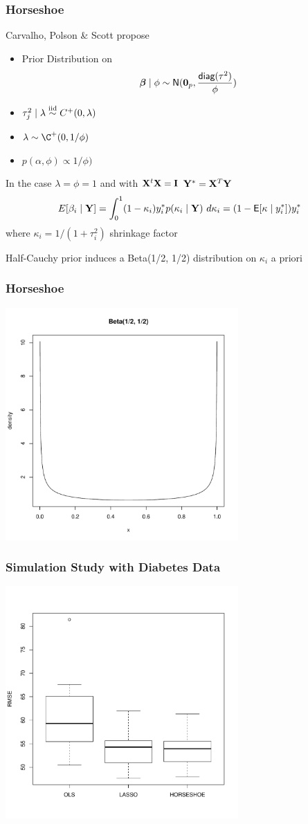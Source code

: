 \documentclass[handout]{beamer}
\begin{document}
\begin{frame}
  \frametitle{Horseshoe}
  Carvalho, Polson \& Scott  propose
\begin{itemize}
\item 
Prior Distribution on $$\boldsymbol{\beta} \mid \phi \sim \textsf{N}(\mathbf{0}_p, \frac{\textsf{diag}(\tau^2)}{ \phi
    }) $$ \pause
\item $\tau_j^2 \mid \lambda \mathrel{\mathop{\sim}\limits^{\rm iid}} C^+(0, \lambda)$ \pause
\item $\lambda \sim \C^+(0, 1/\phi)$ \pause
\item $p(\alpha, \phi) \propto 1/\phi)$ \pause
\end{itemize}

In the case $\lambda = \phi = 1$ and with $\mathbf{X}^t\mathbf{X} = \mathbf{I}$ $\mathbf{Y}^* =
\mathbf{X}^T\mathbf{Y}$ \pause
$$ 
E[\beta_i \mid \mathbf{Y}] = \int_0^1 (1 - \kappa_i) y^*_i p(\kappa_i \mid \mathbf{Y})
\ d\kappa_i = (1 - \textsf{E}[\kappa \mid y^*_i]) y^*_i$$
where $\kappa_i = 1/(1 + \tau_i^2)$ shrinkage factor \pause

\vspace{18pt}
Half-Cauchy prior induces a Beta(1/2, 1/2) distribution on $\kappa_i$
a priori
\end{frame}
\begin{frame}
\frametitle{Horseshoe}
  \includegraphics[height=3.5in]{beta}
\end{frame}



\begin{frame}
  \frametitle{Simulation Study with Diabetes Data}
  \includegraphics[height=3.5in]{diabetes}
\end{frame}
\end{document}
